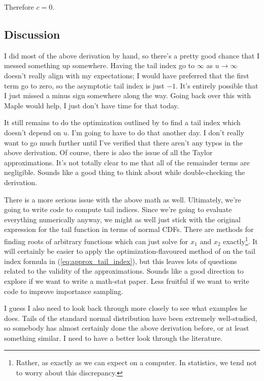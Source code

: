 \documentclass{article}
\begin{document}
Therefore $c=0$.

\subsection{Discussion}

I did most of the above derivation by hand, so there's a pretty good chance that I messed something up somewhere. Having the tail index go to $\infty$ as $u \rightarrow \infty$ doesn't really align with my expectations; I would have preferred that the first term go to zero, so the asymptotic tail index is just $-1$. It's entirely possible that I just missed a minus sign somewhere along the way. Going back over this with Maple would help, I just don't have time for that today.

It still remains to do the optimization outlined by \citet{Pic75} to find a tail index which doesn't depend on $u$. I'm going to have to do that another day. I don't really want to go much further until I've verified that there aren't any typos in the above derivation. Of course, there is also the issue of all the Taylor approximations. It's not totally clear to me that all of the remainder terms are negligible. Sounds like a good thing to think about while double-checking the derivation.

There is a more serious issue with the above math as well. Ultimately, we're going to write code to compute tail indices. Since we're going to evaluate everything numerically anyway, we might as well just stick with the original expression for the tail function in terms of normal CDFs. There are methods for finding roots of arbitrary functions which can just solve for $x_1$ and $x_2$ exactly\footnote{Rather, as exactly as we can expect on a computer. In statistics, we tend not to worry about this discrepancy.}. It will certainly be easier to apply the optimization-flavoured method of \citet{Pic75} on the tail index formula in (\ref{eq:approx_tail_index}), but this leaves lots of questions related to the validity of the approximations. Sounds like a good direction to explore if we want to write a math-stat paper. Less fruitful if we want to write code to improve importance sampling. 

I guess I also need to look back through \citet{Pic75} more closely to see what examples he does. Tails of the standard normal distribution have been extremely well-studied, so somebody has almost certainly done the above derivation before, or at least something similar. I need to have a better look through the literature.





\end{document}
